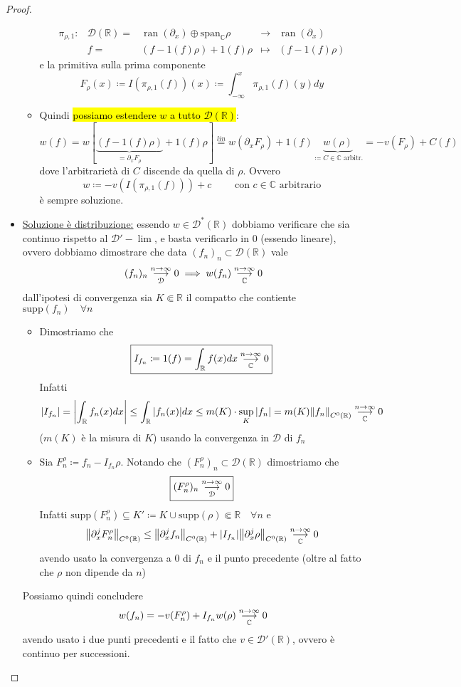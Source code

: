 \documentclass[a4paper,10pt]{article}
\theoremstyle{definition}
\DeclareMathOperator*{\ran}{ran}
\newcommand{\re}{\mathbb{R}} %
\newcommand{\im}{\mathbb{C}} %
\newcommand{\supp}{\text{supp}} %
\newcommand{\limm}[2]{\overunderset{#1\to\infty}{#2}{\longrightarrow}} %
\theoremstyle{indentdefinition}
\theoremstyle{indenttheorem}
\theoremstyle{myremark}
\theoremstyle{indentgeneral}
\begin{document}
\begin{proof}
\begin{itemize}
\begin{itemize}
        $$\begin{array}{ccccc}
           \pi_{\rho,1}: & \mathcal{D}(\re)=& \ran(\partial_x)\oplus\text{span}_\im\rho & \to &\ran(\partial_x)  \\
             & f= & (f-1(f)\rho)+1(f)\rho & \mapsto &(f-1(f)\rho)
        \end{array}$$
        e la primitiva sulla prima componente
        $$F_\rho(x)\coloneqq I(\pi_{\rho,1}(f))(x)\coloneqq \int_{-\infty}^x \pi_{\rho,1}(f)(y)dy$$
         \item Quindi \hl{possiamo estendere $w$ a tutto $\mathcal{D}(\re)$}:
         $$w(f)=w[\underbrace{(f-1(f)\rho)}_{=\partial_x F_\rho}+1(f)\rho]\overset{lin}{=}w(\partial_x F_\rho)+1(f)\underbrace{w(\rho)}_{\coloneqq C\in\im\text{ arbitr.}}=\boxed{-v(F_\rho)+C(f)}$$
        dove l'arbitrarietà di $C$ discende da quella di $\rho$. Ovvero
         $$\boxed{w\coloneqq -v(I(\pi_{\rho,1}(f)))+c \qquad \text{ con }c\in \im \text{ arbitrario}}$$
         è sempre soluzione.
        \end{itemize}
       
        \item \underline{Soluzione è distribuzione:} essendo $w\in\mathcal{D}^*(\re)$ dobbiamo verificare che sia continuo rispetto al $\mathcal{D}'-\lim$, e basta verificarlo in 0 (essendo lineare), ovvero dobbiamo dimostrare che data $(f_n)_n\subset\mathcal{D}(\re)$ vale
        $$(f_n)_n \limm{n}{\mathcal{D}}0\implies w(f_n)\limm{n}{\im}0$$
        dall'ipotesi di convergenza sia $K\Subset\re$ il compatto che contiente $\supp(f_n)\quad \forall n$ 
        \begin{itemize}
            \item Dimostriamo che 
            $$\boxed{I_{f_n}\coloneqq 1(f)=\int_\re f(x)dx\limm{n}{\im}0}$$
            Infatti
            $$\abs{I_{f_n}}=\abs{\int_\re f_n(x)dx}\le \int_\re\abs{f_n(x)}dx\le m(K)\cdot \sup_K\abs{f_n}=m(K)\norm{f_n}_{C^0(\re)}\limm{n}{\im}0 $$
            ($m(K)$ è la misura di $K$) usando la convergenza in $\mathcal{D}$ di $f_n$
            \item Sia $F_n^\rho\coloneqq f_n-I_{f_n}\rho$. Notando che $(F_n^\rho)_n\subset\mathcal{D}(\re)$ dimostriamo che
            $$\boxed{(F_n^\rho)_n\limm{n}{\mathcal{D}}0}$$
            Infatti $\supp(F_n^\rho)\subseteq K'\coloneqq K\cup \supp(\rho)\Subset\re\quad \forall n$ e 
            $$\norm{\partial_x^jF_n^\rho}_{C^0(\re)}\le\norm{\partial_x^jf_n}_{C^0(\re)}+\abs{I_{f_n}}\norm{\partial_x^j\rho}_{C^0(\re)}\limm{n}{\im}0$$
            avendo usato la convergenza a 0 di $f_n$ e il punto precedente (oltre al fatto che $\rho$ non dipende da $n$)
        \end{itemize}
        Possiamo quindi concludere
        $$w(f_n)=-v(F_n^\rho)+I_{f_n}w(\rho)\limm{n}{\im}0$$
        avendo usato i due punti precedenti e il fatto che $v\in\mathcal{D}'(\re)$, ovvero è continuo per successioni.
    \end{itemize}
\end{proof}
\end{document}
